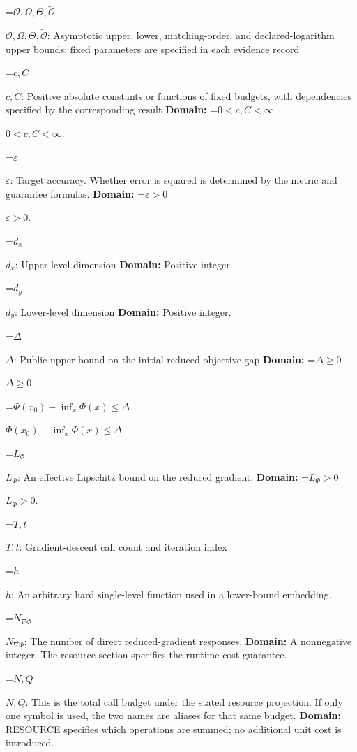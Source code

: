 \documentclass[10pt,a4paper]{article}
\newcommand{\AtlasMath}[1]{\par\begingroup\centering\setbox0=\hbox{$\displaystyle #1$}\ifdim\wd0>1.4\linewidth\typeout{ATLAS WIDE FORMULA: \the\wd0}\fi\ifdim\wd0>\linewidth\resizebox{\linewidth}{!}{\box0}\else\box0\fi\par\endgroup}
\newcommand{\AtlasInlineMath}[1]{\begingroup\setbox0=\hbox{$#1$}\ifdim\wd0>.4\linewidth\endgroup\AtlasMath{#1}\else\endgroup$#1$\fi}
\begin{document}
\AtlasInlineMath{\mathcal O,\Omega,\Theta,\widetilde{\mathcal O}}: Asymptotic upper, lower, matching-order, and declared-logarithm upper bounds; fixed parameters are specified in each evidence record

\AtlasInlineMath{c,C}: Positive absolute constants or functions of fixed budgets, with dependencies specified by the corresponding result \textbf{Domain:} \AtlasInlineMath{0<c,C<\infty}.

\AtlasInlineMath{\varepsilon}: Target accuracy. Whether error is squared is determined by the metric and guarantee formulas. \textbf{Domain:} \AtlasInlineMath{\varepsilon>0}.

\AtlasInlineMath{d_x}: Upper-level dimension \textbf{Domain:} Positive integer.

\AtlasInlineMath{d_y}: Lower-level dimension \textbf{Domain:} Positive integer.

\AtlasInlineMath{\Delta}: Public upper bound on the initial reduced-objective gap \textbf{Domain:} \AtlasInlineMath{\Delta\ge0}.

\AtlasInlineMath{\Phi(x_0)-\inf_x\Phi(x)\le\Delta}

\AtlasInlineMath{L_\Phi}: An effective Lipschitz bound on the reduced gradient. \textbf{Domain:} \AtlasInlineMath{L_\Phi>0}.

\AtlasInlineMath{T,t}: Gradient-descent call count and iteration index

\AtlasInlineMath{h}: An arbitrary hard single-level function used in a lower-bound embedding.

\AtlasInlineMath{N_{\nabla\Phi}}: The number of direct reduced-gradient responses. \textbf{Domain:} A nonnegative integer. The resource section specifies the runtime-cost guarantee.

\AtlasInlineMath{N,Q}: This is the total call budget under the stated resource projection. If only one symbol is used, the two names are aliases for that same budget. \textbf{Domain:} RESOURCE specifies which operations are summed; no additional unit cost is introduced.
\end{document}
